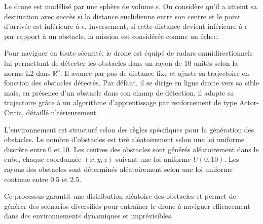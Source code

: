 \documentclass[a4paper, 12pt]{article}
\begin{document}
Le drone est modélisé par une sphère de volume $\epsilon$. On considère qu’il a atteint sa destination avec succès si la distance euclidienne entre son centre et le point d’arrivée est inférieure à $\epsilon$. Inversement, si cette distance devient inférieure à $\epsilon$ par rapport à un obstacle, la mission est considérée comme un échec.

Pour naviguer en toute sécurité, le drone est équipé de radars omnidirectionnels lui permettant de détecter les obstacles dans un rayon de 10 unités selon la norme L2 dans $\mathbb{R}^3$. Il avance par pas de distance fixe et ajuste sa trajectoire en fonction des obstacles détectés. Par défaut, il se dirige en ligne droite vers sa cible mais, en présence d’un obstacle dans son champ de détection, il adapte sa trajectoire grâce à un algorithme d’apprentissage par renforcement de type Actor-Critic, détaillé ultérieurement.

L’environnement est structuré selon des règles spécifiques pour la génération des obstacles. Le nombre d’obstacles est tiré aléatoirement selon une loi uniforme discrète entre 0 et 10. Les centres des obstacles sont générés aléatoirement dans le cube, chaque coordonnée $(x, y, z)$ suivant une loi uniforme $U(0, 10)$. Les rayons des obstacles sont déterminés aléatoirement selon une loi uniforme continue entre 0.5 et 2.5.

Ce processus garantit une distribution aléatoire des obstacles et permet de générer des scénarios diversifiés pour entraîner le drone à naviguer efficacement dans des environnements dynamiques et imprévisibles.
\end{document}
